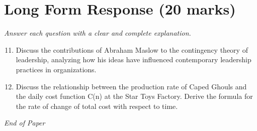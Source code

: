 \documentclass[12pt]{article}
\begin{document}
\section*{Long Form Response (20 marks)}
\textit{Answer each question with a clear and complete explanation.}
\begin{enumerate}[label=\arabic*.]
\setcounter{enumi}{10}
\item Discuss the contributions of Abraham Maslow to the contingency theory of leadership, analyzing how his ideas have influenced contemporary leadership practices in organizations.
\item Discuss the relationship between the production rate of Caped Ghouls and the daily cost function C(n) at the Star Toys Factory. Derive the formula for the rate of change of total cost with respect to time.
\end{enumerate}

\vfill
\noindent\textit{End of Paper}
\end{document}
